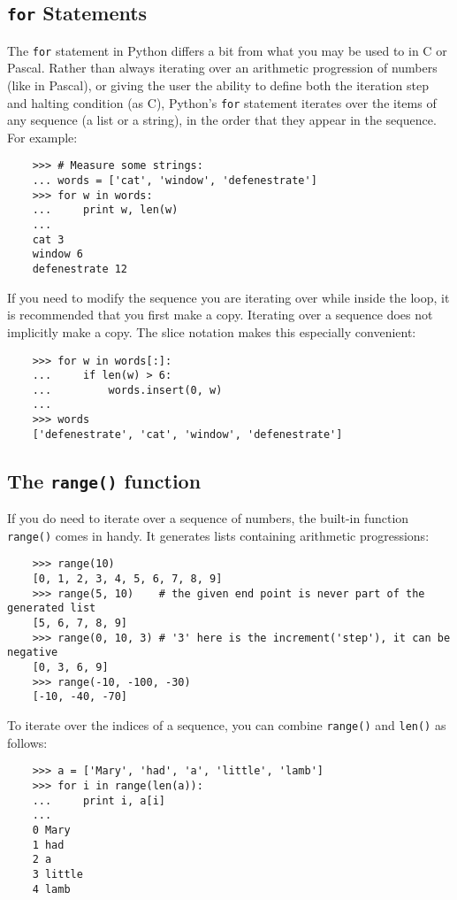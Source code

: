 \documentclass[UTF8]{article}
\begin{document}
\subsection{\texttt{for} Statements}
The \texttt{for} statement in Python differs a bit from what you may be used to in C or Pascal.
Rather than always iterating over an arithmetic progression of numbers (like in Pascal), or giving
the user the ability to define both the iteration step and halting condition (as C), Python's
\texttt{for} statement iterates over the items of any sequence (a list or a string), in the order
that they appear in the sequence. For example:
\begin{verbatim}
    >>> # Measure some strings:
    ... words = ['cat', 'window', 'defenestrate']
    >>> for w in words:
    ...     print w, len(w)
    ...
    cat 3
    window 6
    defenestrate 12
\end{verbatim}

If you need to modify the sequence you are iterating over while inside the loop, it is recommended
that you first make a copy. Iterating over a sequence does not implicitly make a copy. The slice
notation makes this especially convenient:
\begin{verbatim}
    >>> for w in words[:]:
    ...     if len(w) > 6:
    ...         words.insert(0, w)
    ...
    >>> words
    ['defenestrate', 'cat', 'window', 'defenestrate']
\end{verbatim}

\subsection{The \texttt{range()} function}
If you do need to iterate over a sequence of numbers, the built-in function \texttt{range()} comes
in handy. It generates lists containing arithmetic progressions:
\begin{verbatim}
    >>> range(10)
    [0, 1, 2, 3, 4, 5, 6, 7, 8, 9]
    >>> range(5, 10)    # the given end point is never part of the generated list
    [5, 6, 7, 8, 9]
    >>> range(0, 10, 3) # '3' here is the increment('step'), it can be negative
    [0, 3, 6, 9]
    >>> range(-10, -100, -30)
    [-10, -40, -70]
\end{verbatim}

To iterate over the indices of a sequence, you can combine \texttt{range()} and \texttt{len()} as
follows:
\begin{verbatim}
    >>> a = ['Mary', 'had', 'a', 'little', 'lamb']
    >>> for i in range(len(a)):
    ...     print i, a[i]
    ...
    0 Mary
    1 had
    2 a
    3 little
    4 lamb
\end{verbatim}
\end{document}
